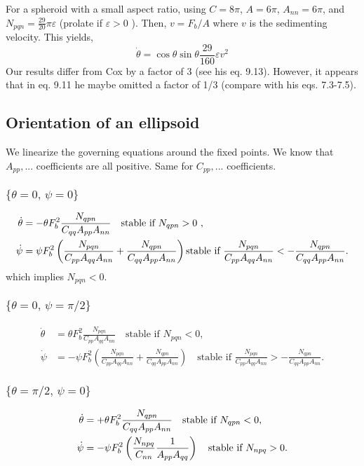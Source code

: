 \documentclass[12pt]{My_preprint}
\begin{document}
For a spheroid with a small aspect ratio, using $C = 8\pi$, $A = 6\pi$, $A_{nn} = 6\pi$, and $N_{pqn} = \frac{29}{20}\pi \varepsilon$ (prolate if $\varepsilon >0$ ).
Then, $v = F_b/A$ where $v$ is the sedimenting velocity. 
This yields, 
\begin{equation}
  \dot \theta  = \cos \theta \sin \theta \frac{29}{160} \varepsilon v^2
\end{equation}
Our results differ from Cox by a factor of 3 (see his eq. 9.13). However, it appears that in eq. 9.11 he maybe omitted a factor of 1/3 (compare with his eqs. 7.3-7.5).


\subsection{Orientation of an ellipsoid}
We linearize the governing equations around the fixed points.
We know that $A_{pp}, ...$ coefficients are all positive. Same for $C_{pp}, ...$ coefficients. 

\subsubsection{$\{\theta = 0, \, \psi = 0\}$}
\begin{align}
    \dot \theta  &=  -\theta F_b^2 \frac{N_{qpn}}{C_{qq}A_{pp} A_{nn}} \quad \text{stable if $ N_{qpn}>0$ }, \\
    \dot \psi   &=  \psi F_b^2 \left(\frac{N_{pqn}}{C_{pp}A_{qq} A_{nn}}+\frac{N_{qpn}}{C_{qq}A_{pp} A_{nn}}\right)\text{stable if $\frac{N_{pqn}}{C_{pp}A_{qq} A_{nn}}  < -\frac{N_{qpn}}{C_{qq}A_{pp} A_{nn}}$}.
\end{align}
which implies $N_{pqn}<0$.

\subsubsection{$\{\theta = 0, \, \psi = \pi/2\}$}
\begin{align}
    \dot \theta  &=  \theta F_b^2 \frac{N_{pqn}}{C_{pp}A_{qq} A_{nn}}\quad \text{stable if $N_{pqn}<0$}, \\
    \dot \psi   &=  -\psi F_b^2 \left(\frac{N_{pqn}}{C_{pp}A_{qq} A_{nn}}+\frac{N_{qpn}}{C_{qq}A_{pp} A_{nn}}\right) \quad \text{stable if $\frac{N_{pqn}}{C_{pp}A_{qq} A_{nn}}  > -\frac{N_{qpn}}{C_{qq}A_{pp} A_{nn}}$}.
\end{align}
\subsubsection{$\{\theta = \pi/2, \, \psi = 0\}$}
\begin{align}
    \dot \theta  &=  +\theta F_b^2 \frac{N_{qpn}}{C_{qq}A_{pp} A_{nn}}\quad \text{stable if $ N_{qpn}<0$}, \\
    \dot \psi   &= -\psi F_b^2 \left(\frac{N_{npq}}{C_{nn}}\frac{1}{A_{pp} A_{qq}}\right)\quad \text{stable if $N_{npq}>0$}.
\end{align}
\end{document}
